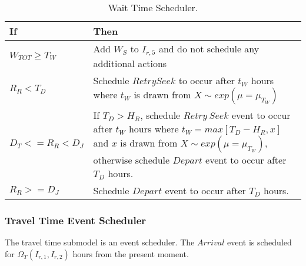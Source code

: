 \documentclass[journal]{IEEEtran}
\begin{document}
\begin{table}[!h]
\def\colmarginA{2.5cm}
\def\colmarginB{5.5cm}
\renewcommand{\arraystretch}{1.3}
\caption{Wait Time Scheduler.}
\label{tab:waitTime}
\centering
\begin{tabular}{|ll|}
\hline
\textbf{If} & \textbf{Then} \\
\hline
\parbox[t]{\colmarginA}{ \raggedright  
    $W_{TOT} \ge T_W$
  }  & \parbox[t]{\colmarginB}{ \raggedright 
    Add $W_S$ to $I_{r,5}$ and do not schedule any additional actions
} \\
\parbox[t]{\colmarginA}{ \raggedright  
    $R_R < T_D$
  }  & \parbox[t]{\colmarginB}{ \raggedright 
    Schedule $Retry Seek$ to occur after $t_W$ hours where $t_W$ is drawn from $X \sim exp(\mu = \mu_{T_W})$\\
} \\
\parbox[t]{\colmarginA}{ \raggedright  
  $D_T <= R_R < D_J$
  }  & \parbox[t]{\colmarginB}{ \raggedright 
If $T_D > H_R$, schedule $Retry ~Seek$ event to occur after $t_W$ hours where $t_W = max[T_D - H_R, x]$ and $x$ is drawn from $X \sim exp(\mu = \mu_{T_W})$, otherwise schedule $Depart$ event to occur after $T_D$ hours.
} \\
\parbox[t]{\colmarginA}{ \raggedright  
  $R_R >= D_J$
  }  & \parbox[t]{\colmarginB}{ \raggedright 
  Schedule $Depart$ event to occur after $T_D$ hours.
} \\
\hline
\end{tabular}
\end{table}

\subsubsection{Travel Time Event Scheduler}\label{travelSched}

The travel time submodel is an event scheduler.  The $Arrival$ event is scheduled for $\Omega_T(I_{r,1},I_{r,2})$ hours from the present moment. 
\end{document}
